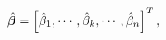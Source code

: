 \begin{equation*}
\label{eq:Beta-hat Structure}
\hat{\boldsymbol{\beta}} = \left[ \hat{\beta}_1, \cdots, \hat{\beta}_k, \cdots, \hat{\beta}_n \right]^T,
\end{equation*}